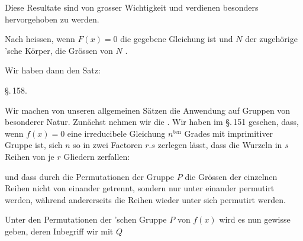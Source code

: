 
Diese Resultate sind von grosser Wichtigkeit und verdienen
besonders hervorgehoben zu werden.

Nach  heissen, wenn $F(x) = 0$ die gegebene
Gleichung ist und $N$ der zugehörige 'sche Körper, die
Grössen von $N$ .

Wir haben dann den Satz:


\begin{center}
\S.\,158.

\end{center}

Wir machen von unseren allgemeinen Sätzen die Anwendung auf
Gruppen von besonderer Natur. Zunächst nehmen wir die
. Wir haben im \S.\,151 gesehen, dass, wenn
$f(x) = 0$ eine irreducibele Gleichung $n^{\mathrm{ten}}$
Grades mit imprimitiver Gruppe ist, sich $n$ so in zwei
Factoren $r \boldsymbol{.} s$ zerlegen lässt, dass die Wurzeln in
$s$ Reihen von je $r$ Gliedern zerfallen:


und dass durch die Permutationen der Gruppe $P$ die Grössen der
einzelnen Reihen nicht von einander getrennt, sondern nur unter
einander permutirt werden, während andererseits die Reihen
wieder unter sich permutirt werden.

Unter den Permutationen der 'schen Gruppe $P$ von $f(x)$
wird es nun gewisse geben, deren Inbegriff wir mit $Q$
